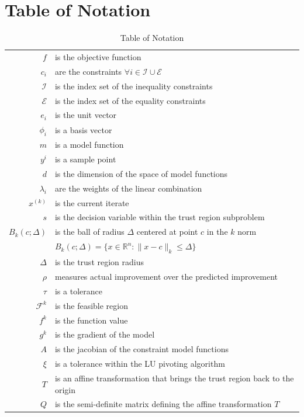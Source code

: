 \documentclass{article}
\theoremstyle{case}
\begin{document}
\section{Table of Notation}
\begin{table}\caption{Table of Notation}
\begin{center}

\begin{tabular}{r p{10cm} }
$f$ & is the objective function \\
$c_i$ & are the constraints $\forall i \in \mathcal{I} \cup \mathcal{E} $ \\
$\mathcal{I}$ & is the index set of the inequality constraints \\
$\mathcal{E}$ & is the index set of the equality constraints \\
$e_i$ & is the unit vector \\
$\phi_i$ & is a basis vector \\
$m$ & is a model function \\
$y^i$ & is a sample point \\
$d$ & is the dimension of the space of model functions \\
$\lambda_i$ & are the weights of the linear combination \\
$x^{(k)}$ & is the current iterate \\
$s$ & is the decision variable within the trust region subproblem \\
$B_k(c; \Delta)$ & is the ball of radius $\Delta$ centered at point $c$ in the $k$ norm\\
& $B_k(c;\Delta) = \{ x \in \mathbb{R}^n : \| x - c\|_k \le \Delta \}$ \\
$\Delta$ & is the trust region radius \\
$\rho$ & measures actual improvement over the predicted improvement \\
$\tau$ & is a tolerance \\
$\mathcal{F}^k$ & is the feasible region \\
$f^k$ & is the function value \\
$g^k$ & is the gradient of the model \\
$A$ & is the jacobian of the constraint model functions \\
$\xi$ & is a tolerance within the LU pivoting algorithm \\
$T$ & is an affine transformation that brings the trust region back to the origin \\
$Q$ & is the semi-definite matrix defining the affine transformation $T$ \\

\end{tabular}
\end{center}
\end{table}
\end{document}
